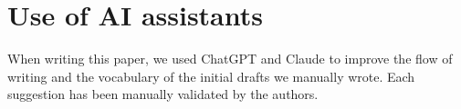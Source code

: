 \section{Use of AI assistants}
\label{sec:ai}
When writing this paper, we used ChatGPT and Claude to improve the flow of writing and the vocabulary of the initial drafts we manually wrote. Each suggestion has been manually validated by the authors.